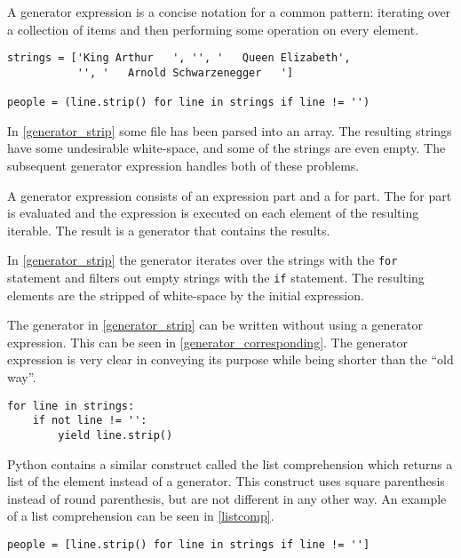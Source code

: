 A generator expression is a concise notation for a common pattern: iterating over a collection of items and then performing some operation on every element\citep{python_functional}.

\begin{lstlisting}[style=python, caption={Generator expression, stripping white-space from strings}, label={generator_strip}]
strings = ['King Arthur   ', '', '   Queen Elizabeth',
           '', '   Arnold Schwarzenegger   ']

people = (line.strip() for line in strings if line != '')
\end{lstlisting}

In \cref{generator_strip} some file has been parsed into an array.
The resulting strings have some undesirable white-space, and some of the strings are even empty.
The subsequent generator expression handles both of these problems.

A generator expression consists of an expression part and a for part.
The for part is evaluated and the expression is executed on each element of the resulting iterable.
The result is a generator that contains the results.

In \cref{generator_strip} the generator iterates over the strings with the \texttt{for} statement and filters out empty strings with the \texttt{if} statement.
The resulting elements are the stripped of white-space by the initial expression.

The generator in \cref{generator_strip} can be written without using a generator expression.
This can be seen in \cref{generator_corresponding}.
The generator expression is very clear in conveying its purpose while being shorter than the ``old way''.
\begin{lstlisting}[style=python, caption={\Cref{generator_strip} implemented without using an generator expression}, label={generator_corresponding}]
for line in strings:
    if not line != '':
        yield line.strip()
\end{lstlisting}

Python contains a similar construct called the list comprehension which returns a list of the element instead of a generator.
This construct uses square parenthesis instead of round parenthesis, but are not different in any other way.
An example of a list comprehension can be seen in \cref{listcomp}.

\begin{lstlisting}[style=python, caption={The generator from \cref{generator_strip} changed to a list comprehension}, label={listcomp}]
people = [line.strip() for line in strings if line != '']
\end{lstlisting}
